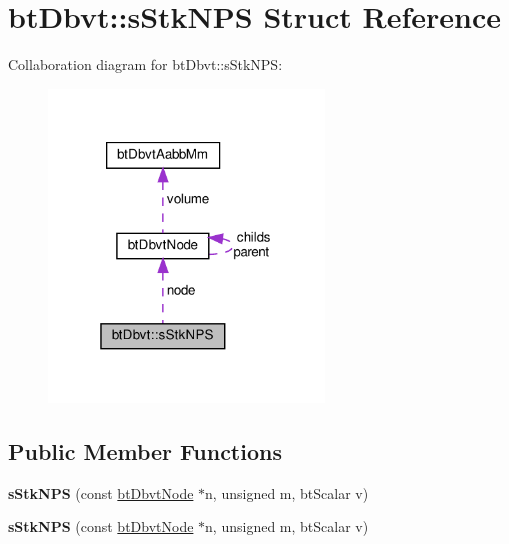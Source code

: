 \hypertarget{structbtDbvt_1_1sStkNPS}{}\section{bt\+Dbvt\+:\+:s\+Stk\+N\+PS Struct Reference}
\label{structbtDbvt_1_1sStkNPS}


Collaboration diagram for bt\+Dbvt\+:\+:s\+Stk\+N\+PS\+:
\nopagebreak
\begin{figure}[H]
\begin{center}
\leavevmode
\includegraphics[width=208pt]{structbtDbvt_1_1sStkNPS__coll__graph}
\end{center}
\end{figure}
\subsection*{Public Member Functions}
\begin{DoxyCompactItemize}
\item 
\mbox{\label{structbtDbvt_1_1sStkNPS_af66a65288f97b62b5bd6d7b4cfa3ce6c}} 
{\bfseries s\+Stk\+N\+PS} (const \hyperlink{structbtDbvtNode}{bt\+Dbvt\+Node} $\ast$n, unsigned m, bt\+Scalar v)
\item 
\mbox{\label{structbtDbvt_1_1sStkNPS_af66a65288f97b62b5bd6d7b4cfa3ce6c}} 
{\bfseries s\+Stk\+N\+PS} (const \hyperlink{structbtDbvtNode}{bt\+Dbvt\+Node} $\ast$n, unsigned m, bt\+Scalar v)
\end{DoxyCompactItemize}
